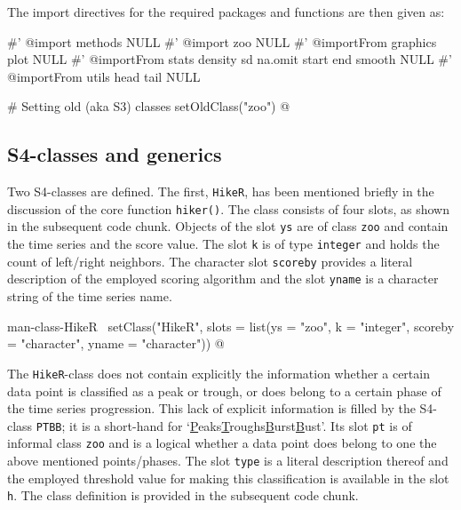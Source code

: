 \documentclass[a4paper]{article}
\begin{document}
The import directives for the required packages and functions are then
given as:

\nwenddocs{}\endmoddef
#' @import methods
NULL
#' @import zoo
NULL
#' @importFrom graphics plot
NULL
#' @importFrom stats density sd na.omit start end smooth
NULL
#' @importFrom utils head tail
NULL

# Setting old (aka S3) classes
setOldClass("zoo")
\nwendcode{}@

\subsection{S4-classes and generics}
\label{S3SS2}

Two S4-classes are defined. The first, \verb?HikeR?, has been
mentioned briefly in the discussion of the core function
\verb?hiker()?. The class consists of four slots, as shown in the
subsequent code chunk. Objects of the slot \verb?ys? are of class \verb?zoo?
and contain the time series and the score value. The slot \verb?k? is of
type \verb?integer? and holds the count of left/right neighbors. The
character slot \verb?scoreby? provides a literal description of the
employed scoring algorithm and the slot \verb?yname? is a character
string of the time series name.

\nwenddocs{}\endmoddef
\LA{}man-class-HikeR~{\nwtagstyle{}}\RA{}
setClass("HikeR", slots = list(ys = "zoo",
                               k = "integer",
                               scoreby = "character",
                               yname = "character"))
\nwendcode{}@

The \verb?HikeR?-class does not contain explicitly the information
whether a certain data point is classified as a peak or trough, or
does belong to a certain phase of the time series progression. This
lack of explicit information is filled by the S4-class \verb?PTBB?; it is
a short-hand for
`\underline{P}eaks\underline{T}roughs\underline{B}urst\underline{B}ust'. Its
slot \verb?pt? is of informal class \verb?zoo? and is a logical whether a
data point does belong to one the above mentioned points/phases. The
slot \verb?type? is a literal description thereof and the employed
threshold value for making this classification is available in the
slot \verb?h?. The class definition is provided in the subsequent code
chunk.
\end{document}
